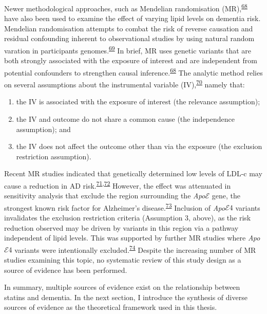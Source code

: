 \documentclass[a4paper, twoside]{templates/ociamthesis}
\providecommand{\tightlist}{%
  \setlength{\itemsep}{0pt}\setlength{\parskip}{0pt}}
\begin{document}
Newer methodological approaches, such as Mendelian randomisation (MR),\textsuperscript{\protect\hyperlink{ref-daveysmith2014}{68}} have also been used to examine the effect of varying lipid levels on dementia risk. Mendelian randomisation attempts to combat the risk of reverse causation and residual confounding inherent to observational studies by using natural random varation in participants genomes.\textsuperscript{\protect\hyperlink{ref-greenland2000}{69}} In brief, MR uses genetic variants that are both strongly associated with the exposure of interest and are independent from potential confounders to strengthen causal inference.\textsuperscript{\protect\hyperlink{ref-daveysmith2014}{68}} The analytic method relies on several assumptions about the instrumental variable (IV),\textsuperscript{\protect\hyperlink{ref-davies2018}{70}} namely that:

\begin{enumerate}
\def\labelenumi{\arabic{enumi}.}
\tightlist
\item
  the IV is associated with the exposure of interest (the relevance assumption);
\item
  the IV and outcome do not share a common cause (the independence assumption); and
\item
  the IV does not affect the outcome other than via the exposure (the exclusion restriction assumption).
\end{enumerate}

Recent MR studies indicated that genetically determined low levels of LDL-c may cause a reduction in AD risk.\textsuperscript{\protect\hyperlink{ref-larsson2017}{71},\protect\hyperlink{ref-ostergaard2015}{72}} However, the effect was attenuated in sensitivity analysis that exclude the region surrounding the \emph{Apo}\(\mathcal{E}\) gene, the strongest known risk factor for Alzheimer's disease.\textsuperscript{\protect\hyperlink{ref-kim2009}{73}} Inclusion of \emph{Apo}\(\mathcal{E}4\) variants invalidates the exclusion restriction criteria (Assumption 3, above), as the risk reduction observed may be driven by variants in this region via a pathway independent of lipid levels. This was supported by further MR studies where \emph{Apo}\(\mathcal{E}4\) variants were intentionally excluded.\textsuperscript{\protect\hyperlink{ref-benn2017}{74}} Despite the increasing number of MR studies examining this topic, no systematic review of this study design as a source of evidence has been performed.

In summary, multiple sources of evidence exist on the relationship between statins and dementia. In the next section, I introduce the synthesis of diverse sources of evidence as the theoretical framework used in this thesis.
\end{document}
